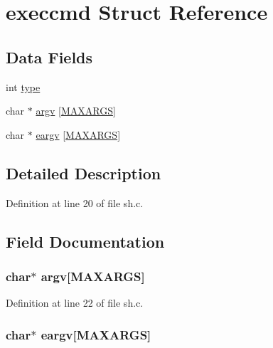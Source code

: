 \hypertarget{structexeccmd}{\section{execcmd Struct Reference}
\label{structexeccmd}
}
\subsection*{Data Fields}
\begin{DoxyCompactItemize}
\item 
int \hyperlink{structexeccmd_ac765329451135abec74c45e1897abf26}{type}
\item 
char $\ast$ \hyperlink{structexeccmd_aa5d608d354aee96f33c2fdca9a819305}{argv} \mbox{[}\hyperlink{sh_8c_a41101847771d39a4f0a7f9395061c629}{M\-A\-X\-A\-R\-G\-S}\mbox{]}
\item 
char $\ast$ \hyperlink{structexeccmd_aba17a3c518eb2ffd68f0219cc8c1792b}{eargv} \mbox{[}\hyperlink{sh_8c_a41101847771d39a4f0a7f9395061c629}{M\-A\-X\-A\-R\-G\-S}\mbox{]}
\end{DoxyCompactItemize}


\subsection{Detailed Description}


Definition at line 20 of file sh.\-c.



\subsection{Field Documentation}
\hypertarget{structexeccmd_aa5d608d354aee96f33c2fdca9a819305}{
\subsubsection[{argv}]{\setlength{\rightskip}{0pt plus 5cm}char$\ast$ argv\mbox{[}{\bf M\-A\-X\-A\-R\-G\-S}\mbox{]}}}\label{structexeccmd_aa5d608d354aee96f33c2fdca9a819305}


Definition at line 22 of file sh.\-c.

\hypertarget{structexeccmd_aba17a3c518eb2ffd68f0219cc8c1792b}{
\subsubsection[{eargv}]{\setlength{\rightskip}{0pt plus 5cm}char$\ast$ eargv\mbox{[}{\bf M\-A\-X\-A\-R\-G\-S}\mbox{]}}}\label{structexeccmd_aba17a3c518eb2ffd68f0219cc8c1792b}


